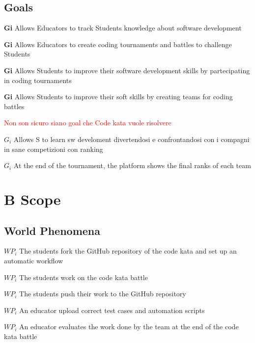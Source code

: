 \subsection{Goals}
\begin{description}
    \item \textbf{Gi} \quad Allows Educators to track Students knowledge about software development  
    \item \textbf{Gi} \quad Allows Educators to create coding tournaments and battles to challenge Students
    \item \textbf{Gi} \quad Allows Students to improve their software development skills by partecipating in coding tournaments 
    \item \textbf{Gi} \quad Allows Students to improve their soft skills by creating teams for coding battles 
    
    \textcolor{red}{Non son sicuro siano goal che Code kata vuole risolvere}
    \item \(G_i\) Allows S to learn sw develoment divertendosi e confrontandosi con i compagni in sane competizioni con ranking
    \item \(G_i\) At the end of the tournament, the platform shows the final ranks of each team
\end{description}

\blindtext
\section{B Scope}

\subsection{World Phenomena}
\begin{description}
    \item \(WP_i\) The students fork the GitHub repository of the code kata and set up an automatic workflow
    \item \(WP_i\) The students work on the code kata battle
    \item \(WP_i\) The students push their work to the GitHub repository
    \item \(WP_i\) An educator upload correct test cases and automation scripts
    \item \(WP_i\) An educator evaluates the work done by the team at the end of the code kata battle
\end{description}

